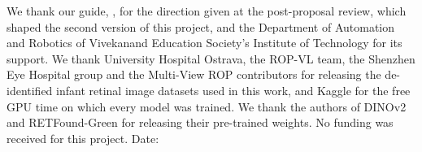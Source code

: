 \noindent We thank our guide, \GuideName, for the direction given at the post-proposal review, which shaped the second version of this project, and the Department of Automation and Robotics of Vivekanand Education Society's Institute of Technology for its support. We thank University Hospital Ostrava, the ROP-VL team, the Shenzhen Eye Hospital group and the Multi-View ROP contributors for releasing the de-identified infant retinal image datasets used in this work, and Kaggle for the free GPU time on which every model was trained. We thank the authors of DINOv2 and RETFound-Green for releasing their pre-trained weights. No funding was received for this project. 
\vspace{15mm}
\begingroup\singlespacing\setlength{\parskip}{0pt}
\noindent\StudentSignatures\endgroup
\vfill\noindent Date: \Blank[45mm]
\clearpage
